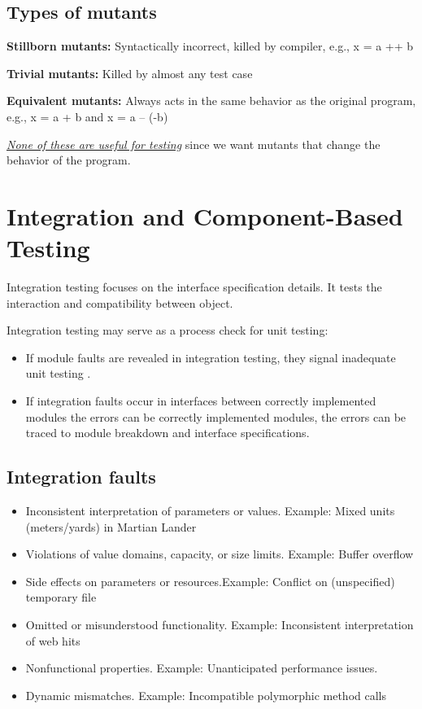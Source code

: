 \documentclass{article}
\begin{document}
\subsection{Types of mutants}

\textbf{Stillborn mutants:} Syntactically incorrect, killed by compiler, e.g., x = a ++ b

\textbf{Trivial mutants:}  Killed by almost any test case

\textbf{Equivalent mutants:} Always acts in the same behavior as the original program, e.g., x = a + b and x = a – (-b)

\textit{\underline{None of these are useful for testing}} since we want mutants that change the behavior of the program.

\section{Integration and Component-Based Testing}
Integration testing focuses on the interface specification details. It tests the interaction and compatibility between object.

Integration testing may serve as a process check for unit testing:
\begin{itemize}
 \item If module faults are revealed in integration testing, they signal inadequate unit testing .
 \item If integration faults occur in interfaces between
correctly implemented modules the errors can be correctly implemented modules, the errors can be traced to module breakdown and interface specifications. 
\end{itemize}

\subsection{Integration faults}
\begin{itemize}
 \item  Inconsistent interpretation of parameters or values. Example: Mixed units (meters/yards) in Martian Lander
 \item Violations of value domains, capacity, or size limits. Example: Buffer overflow
  \item Side effects on parameters or resources.Example: Conflict on (unspecified) temporary file
   \item  Omitted or misunderstood functionality. Example: Inconsistent interpretation of web hits
 \item Nonfunctional properties. Example: Unanticipated performance issues.
  \item Dynamic mismatches.  Example: Incompatible polymorphic method calls
\end{itemize}
\end{document}
